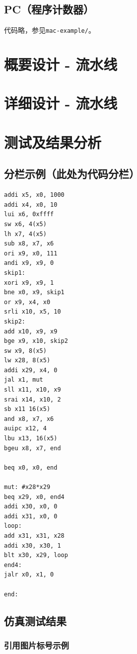 \documentclass[UTF8,a4paper,autofakebold,15pt]{ctexart}
\begin{document}
\subsection{PC（程序计数器）}

代码略，参见{\tt mac-example/}。

\newpage
\section{概要设计 - 流水线}

\section{详细设计 - 流水线}

\newpage
\section{测试及结果分析}

\subsection{分栏示例（此处为代码分栏）}

\begin{multicols}{2}
{
\begin{lstlisting}
addi x5, x0, 1000
addi x4, x0, 10
lui x6, 0xffff
sw x6, 4(x5)
lh x7, 4(x5)
sub x8, x7, x6
ori x9, x0, 111
andi x9, x9, 0
skip1:
xori x9, x9, 1
bne x0, x9, skip1
or x9, x4, x0
srli x10, x5, 10
skip2:
add x10, x9, x9
bge x9, x10, skip2
sw x9, 8(x5)
lw x28, 8(x5)
addi x29, x4, 0
jal x1, mut
sll x11, x10, x9
srai x14, x10, 2
sb x11 16(x5)
and x8, x7, x6
auipc x12, 4
lbu x13, 16(x5)
bgeu x8, x7, end

beq x0, x0, end

mut: #x28*x29
beq x29, x0, end4
addi x30, x0, 0
addi x31, x0, 0
loop:
add x31, x31, x28
addi x30, x30, 1
blt x30, x29, loop
end4:
jalr x0, x1, 0

end:
\end{lstlisting}}
\end{multicols}
\subsection{仿真测试结果}
\subsubsection{引用图片标号示例}
\end{document}
